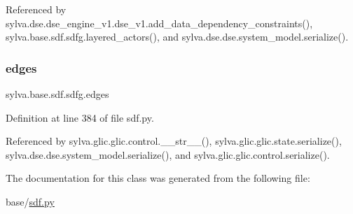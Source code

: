 Referenced by sylva.\+dse.\+dse\+\_\+engine\+\_\+v1.\+dse\+\_\+v1.\+add\+\_\+data\+\_\+dependency\+\_\+constraints(), sylva.\+base.\+sdf.\+sdfg.\+layered\+\_\+actors(), and sylva.\+dse.\+dse.\+system\+\_\+model.\+serialize().

\mbox{\label{classsylva_1_1base_1_1sdf_1_1sdfg_a1c2b2c217ea9a12397686313ae4146d5}} 
\subsubsection{\texorpdfstring{edges}{edges}}
{\footnotesize\ttfamily sylva.\+base.\+sdf.\+sdfg.\+edges}



Definition at line 384 of file sdf.\+py.



Referenced by sylva.\+glic.\+glic.\+control.\+\_\+\+\_\+str\+\_\+\+\_\+(), sylva.\+glic.\+glic.\+state.\+serialize(), sylva.\+dse.\+dse.\+system\+\_\+model.\+serialize(), and sylva.\+glic.\+glic.\+control.\+serialize().



The documentation for this class was generated from the following file\+:\begin{DoxyCompactItemize}
\item 
base/\hyperlink{sdf_8py}{sdf.\+py}\end{DoxyCompactItemize}
